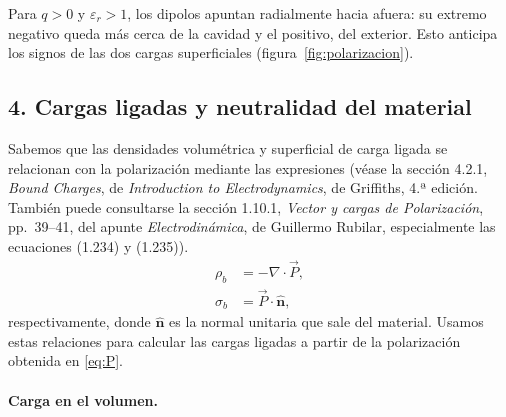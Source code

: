 \documentclass[11pt]{article}
\newcommand{\normal}{\hat{\mathbf n}}
\begin{document}
Para $q>0$ y $\varepsilon_r>1$, los dipolos apuntan radialmente
hacia afuera: su extremo negativo queda más cerca de la cavidad
y el positivo, del exterior. Esto anticipa los signos de las dos
cargas superficiales (figura~\ref{fig:polarizacion}).

\subsection*{4. Cargas ligadas y neutralidad del material}

Sabemos que las densidades volumétrica y superficial de carga
ligada se relacionan con la polarización mediante las
expresiones (véase la sección 4.2.1, \emph{Bound Charges}, de \emph{Introduction to Electrodynamics}, de Griffiths,
4.ª edición. También puede consultarse la sección 1.10.1,
\emph{Vector y cargas de Polarización}, pp.~39--41,
del apunte \emph{Electrodinámica}, de Guillermo Rubilar, especialmente las ecuaciones
(1.234) y (1.235)).
\begin{align}
  \rho_b
    &=-\nabla\cdot\vec P,
      \label{eq:rho_b}\\[5pt]
  \sigma_b
    &=\vec P\cdot\normal,
      \label{eq:sigma}
\end{align}
respectivamente, donde $\normal$ es la normal unitaria que sale
del material. Usamos estas relaciones para calcular las cargas
ligadas a partir de la polarización obtenida en \eqref{eq:P}.

\paragraph{Carga en el volumen.}
\end{document}
